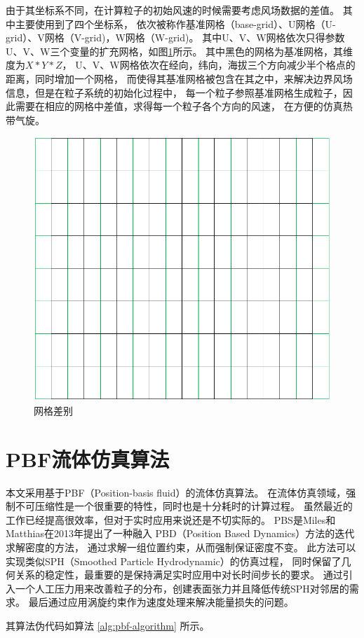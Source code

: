 由于其坐标系不同，在计算粒子的初始风速的时候需要考虑风场数据的差值。
其中主要使用到了四个坐标系，
依次被称作基准网格（base-grid）、U网格（U-grid）、V网格（V-grid)，W网格（W-grid)。
其中U、V、W网格依次只得参数U、V、W三个变量的扩充网格，如图\ref{fig:diff-grid}所示。
其中黑色的网格为基准网格，其维度为$X*Y*Z$，
U、V、W网格依次在经向，纬向，海拔三个方向减少半个格点的距离，同时增加一个网格，
而使得其基准网格被包含在其之中，来解决边界风场信息，但是在粒子系统的初始化过程中，
每一个粒子参照基准网格生成粒子，因此需要在相应的网格中差值，求得每一个粒子各个方向的风速，
在方便的仿真热带气旋。
\begin{figure}
	\centering 
	\includegraphics[width=200bp]{figure/grid.png}
	\caption{网格差别}
	\label{fig:diff-grid}
\end{figure}

\section{PBF流体仿真算法}


本文采用基于PBF（Position-basis fluid）的流体仿真算法。
在流体仿真领域，强制不可压缩性是一个很重要的特性，同时也是十分耗时的计算过程。
虽然最近的工作已经提高很效率，但对于实时应用来说还是不切实际的。
PBS是Miles和Matthias在2013年提出了一种融入
PBD（Position Based Dynamics）方法的迭代求解密度的方法，
通过求解一组位置约束，从而强制保证密度不变。
此方法可以实现类似SPH（Smoothed Particle Hydrodynamic）的仿真过程，
同时保留了几何关系的稳定性，最重要的是保持满足实时应用中对长时间步长的要求。
通过引入一个人工压力用来改善粒子的分布，创建表面张力并且降低传统SPH对邻居的需求。
最后通过应用涡旋约束作为速度处理来解决能量损失的问题。

其算法伪代码如算法 \ref{alg:pbf-algorithm} 所示。

